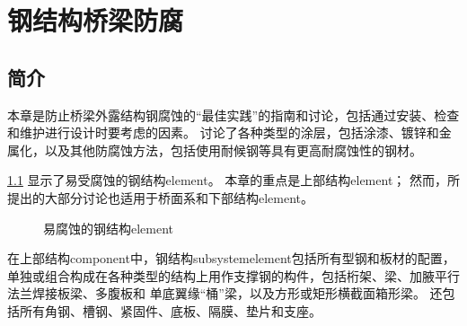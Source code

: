 \chapter{钢结构桥梁防腐}
\label{chp:corrosion-prevention-steel-bridge}
\section{简介}
本章是防止桥梁外露结构钢腐蚀的“最佳实践”的指南和讨论，包括通过安装、检查和维护进行设计时要考虑的因素。 讨论了各种类型的涂层，包括涂漆、镀锌和金属化，以及其他防腐蚀方法，包括使用耐候钢等具有更高耐腐蚀性的钢材。

\cref{fig:steel-elements-corrosion} 显示了易受腐蚀的钢结构\gls*{element}。 本章的重点是上部结构\gls*{element}； 然而，所提出的大部分讨论也适用于桥面系和下部结构\gls*{element}。

\begin{figure}
  \caption{易腐蚀的钢结构\gls*{element}}
  \label{fig:steel-elements-corrosion}
\end{figure}

在上部结构\gls*{component}中，钢结构\gls*{subsystem}\gls*{element}包括所有型钢和板材的配置，单独或组合构成在各种类型的结构上用作支撑钢的构件，包括桁架、梁、加腋平行法兰焊接板梁、多腹板和 单底翼缘“桶”梁，以及方形或矩形横截面箱形梁。 还包括所有角钢、槽钢、紧固件、底板、隔膜、垫片和支座。

